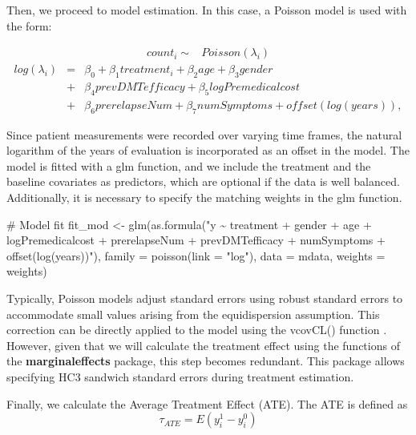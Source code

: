\documentclass[
  letterpaper,
  DIV=11,
  numbers=noendperiod]{scrreprt}
\newenvironment{Shaded}{\begin{snugshade}}{\end{snugshade}}
\newcommand{\AttributeTok}[1]{\textcolor[rgb]{0.40,0.45,0.13}{#1}}
\newcommand{\CommentTok}[1]{\textcolor[rgb]{0.37,0.37,0.37}{#1}}
\newcommand{\FunctionTok}[1]{\textcolor[rgb]{0.28,0.35,0.67}{#1}}
\newcommand{\NormalTok}[1]{\textcolor[rgb]{0.00,0.23,0.31}{#1}}
\newcommand{\OtherTok}[1]{\textcolor[rgb]{0.00,0.23,0.31}{#1}}
\newcommand{\StringTok}[1]{\textcolor[rgb]{0.13,0.47,0.30}{#1}}
\begin{document}
Then, we proceed to model estimation. In this case, a Poisson model is
used with the form:

\[\begin{eqnarray}count_i\sim& Poisson(\lambda_i)\end{eqnarray}\]
\[\begin{eqnarray} log(\lambda_i) &=& \beta_0 + \beta_1treatment_i + \beta_2age + \beta_3gender \\ &+& \beta_4prevDMTefficacy + \beta_5logPremedicalcost
\\ &+& \beta_6prerelapseNum + \beta_7numSymptoms + offset(log(years)),\end{eqnarray}\]

Since patient measurements were recorded over varying time frames, the
natural logarithm of the years of evaluation is incorporated as an
offset in the model. The model is fitted with a glm function, and we
include the treatment and the baseline covariates as predictors, which
are optional if the data is well balanced. Additionally, it is necessary
to specify the matching weights in the glm function.

\begin{Shaded}
\begin{Highlighting}[]
\CommentTok{\# Model fit}
\NormalTok{fit\_mod }\OtherTok{\textless{}{-}} \FunctionTok{glm}\NormalTok{(}\FunctionTok{as.formula}\NormalTok{(}\StringTok{"y \textasciitilde{} treatment + gender + age + logPremedicalcost + prerelapseNum + prevDMTefficacy + numSymptoms + offset(log(years))"}\NormalTok{),}
                 \AttributeTok{family =} \FunctionTok{poisson}\NormalTok{(}\AttributeTok{link =} \StringTok{"log"}\NormalTok{),}
                 \AttributeTok{data =}\NormalTok{ mdata,}
                 \AttributeTok{weights =}\NormalTok{ weights)}
\end{Highlighting}
\end{Shaded}

Typically, Poisson models adjust standard errors using robust standard
errors to accommodate small values arising from the equidispersion
assumption. This correction can be directly applied to the model using
the vcovCL() function \cite{zeileis_sandwich_2022}. However, given that
we will calculate the treatment effect using the functions of the
\textbf{marginaleffects} package, this step becomes redundant. This
package allows specifying HC3 sandwich standard errors during treatment
estimation.

Finally, we calculate the Average Treatment Effect (ATE). The ATE is
defined as \[\tau_{ATE}=E(y_i^1-y_i^0)\]
\end{document}
